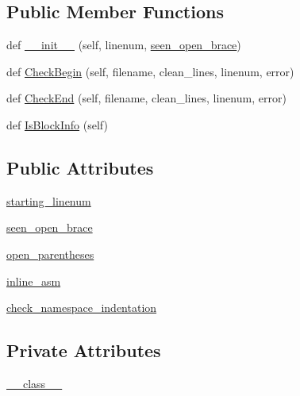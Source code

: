 \subsection*{Public Member Functions}
\begin{DoxyCompactItemize}
\item 
def \hyperlink{classcpplint_1_1__BlockInfo_ab1663260e978a348a4ff2ab9d7324587}{\+\_\+\+\_\+init\+\_\+\+\_\+} (self, linenum, \hyperlink{classcpplint_1_1__BlockInfo_aa974539217437751383ad20896c974d7}{seen\+\_\+open\+\_\+brace})
\item 
def \hyperlink{classcpplint_1_1__BlockInfo_af316a9e3623b45bd07079166be67582c}{Check\+Begin} (self, filename, clean\+\_\+lines, linenum, error)
\item 
def \hyperlink{classcpplint_1_1__BlockInfo_ae504a3429de136eebf85f32fcae6a8ca}{Check\+End} (self, filename, clean\+\_\+lines, linenum, error)
\item 
def \hyperlink{classcpplint_1_1__BlockInfo_ab3e06a94a38d7397ce6a4faa094010d4}{Is\+Block\+Info} (self)
\end{DoxyCompactItemize}
\subsection*{Public Attributes}
\begin{DoxyCompactItemize}
\item 
\hyperlink{classcpplint_1_1__BlockInfo_a81d316f03e42aebbfe0636f905c4c291}{starting\+\_\+linenum}
\item 
\hyperlink{classcpplint_1_1__BlockInfo_aa974539217437751383ad20896c974d7}{seen\+\_\+open\+\_\+brace}
\item 
\hyperlink{classcpplint_1_1__BlockInfo_a02a0b48995a599f6b2bbaa6f16cca98a}{open\+\_\+parentheses}
\item 
\hyperlink{classcpplint_1_1__BlockInfo_aad762ef7088f2f556a75c9a80006f4db}{inline\+\_\+asm}
\item 
\hyperlink{classcpplint_1_1__BlockInfo_a120822b07db37b3480a573ec29ee4457}{check\+\_\+namespace\+\_\+indentation}
\end{DoxyCompactItemize}
\subsection*{Private Attributes}
\begin{DoxyCompactItemize}
\item 
\hyperlink{classcpplint_1_1__BlockInfo_a7c54b321d58202156d14cb1aeabd9563}{\+\_\+\+\_\+class\+\_\+\+\_\+}
\end{DoxyCompactItemize}


